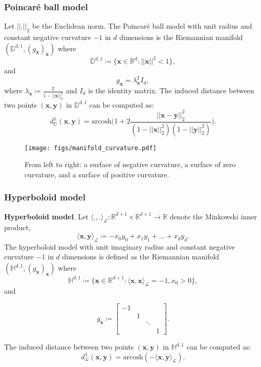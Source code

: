 \documentclass{article}
\newcommand{\xhdr}[1]{{\noindent\bfseries #1}.}
\begin{document}
\subsubsection{Poincar\'e ball model}
Let $||.||_2$ be the Euclidean norm. 
The Poincar\'e ball model with unit radius and constant negative curvature $-1$ in $d$ dimensions is the Riemannian manifold $(\mathbb{D}^{d,1},(g_\mathbf{x})_\mathbf{x})$ where
$$\mathbb{D}^{d,1}\coloneqq\{\mathbf{x}\in\mathbb{R}^d:||\mathbf{x}||^2<1\},$$
and
$$g_\mathbf{x}=\lambda_\mathbf{x}^2I_d,$$
where $\lambda_\mathbf{x}\coloneqq\frac{2}{1-||\mathbf{x}||_2^2}$ and $I_d$ is the identity matrix.  
The induced distance between two points $(\mathbf{x}, \mathbf{y})$ in $\mathbb{D}^{d,1}$ can be computed as:
$$d_\mathbb{D}^1(\mathbf{x}, \mathbf{y})=\mathrm{arcosh}\bigg(1 + 2\frac{||\mathbf{x}-\mathbf{y}||_2^2}{(1-||\mathbf{x}||_2^2)(1-||\mathbf{y}||_2^2)}\bigg).$$

\begin{figure}[t]
\begin{center}
    \texttt{[image: figs/manifold\_curvature.pdf]}
  \end{center}
\caption{From left to right: a surface of negative curvature, a surface of zero curvature, and a surface of positive curvature.}
  \label{fig:manifold_curvature}
\end{figure}
\subsubsection{Hyperboloid model}
\xhdr{Hyperboloid model}
Let $\langle.,.\rangle_{\mathcal{L}}:\mathbb{R}^{d+1}\times\mathbb{R}^{d+1}\rightarrow\mathbb{R}$ denote the Minkowski inner product,
$$\langle\mathbf{x},\mathbf{y}\rangle_\mathcal{L}\coloneqq-x_0y_0+x_1y_1+\ldots+x_dy_d.$$
The hyperboloid model with unit imaginary radius and constant negative curvature $-1$ in $d$ dimensions is defined as the Riemannian manifold $(\mathbb{H}^{d,1},(g_\mathbf{x})_\mathbf{x})$ where
$$\mathbb{H}^{d,1}\coloneqq\{\mathbf{x}\in\mathbb{R}^{d+1}:\langle\mathbf{x},\mathbf{x}\rangle_\mathcal{L}=-1,x_0>0\},$$
and
\begin{small}
$$g_\mathbf{x}\coloneqq\begin{bmatrix}
-1 & & & \\
& 1 & & \\
& & \ddots & \\
& & & 1 
\end{bmatrix}.$$
\end{small}
The induced distance between two points $(\mathbf{x}, \mathbf{y})$ in $\mathbb{H}^{d,1}$ can be computed as:
$$d^1_\mathcal{L}(\mathbf{x},\mathbf{y})=\mathrm{arcosh}(-\langle\mathbf{x},\mathbf{y}\rangle_\mathcal{L}).$$
\end{document}
